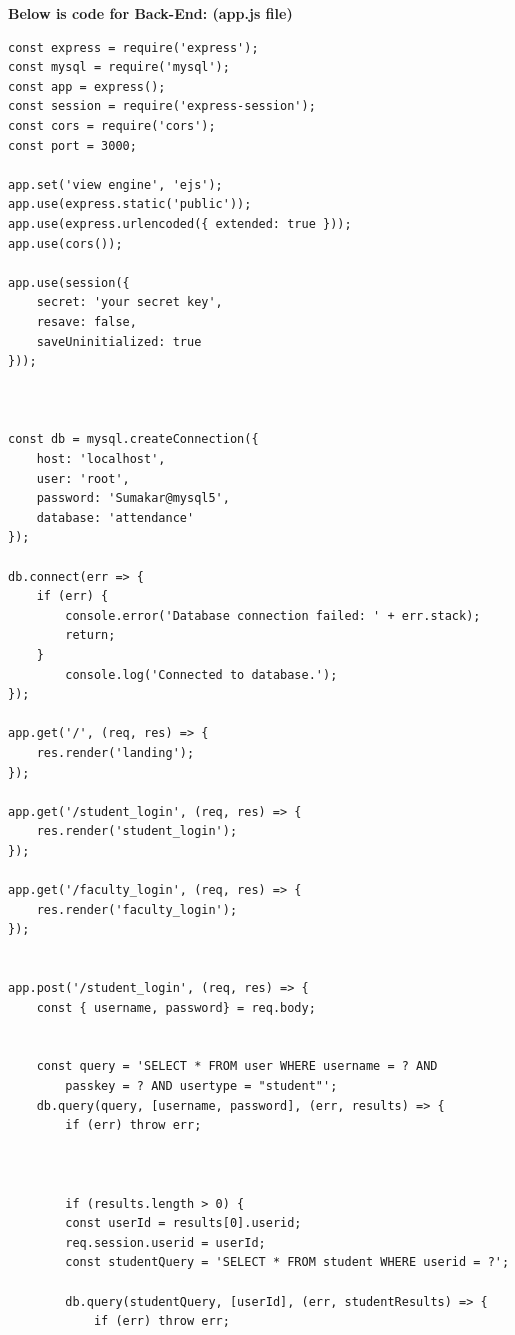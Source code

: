 \documentclass{article}
\begin{document}
\begin{large}
\vspace*{1cm}
\bfseries{Below is code for Back-End: (app.js file)}
\begin{verbatim}
const express = require('express');
const mysql = require('mysql');
const app = express();
const session = require('express-session');
const cors = require('cors');
const port = 3000;

app.set('view engine', 'ejs');
app.use(express.static('public'));
app.use(express.urlencoded({ extended: true }));
app.use(cors());

app.use(session({
    secret: 'your secret key',
    resave: false,
    saveUninitialized: true
}));



const db = mysql.createConnection({
    host: 'localhost',
    user: 'root',
    password: 'Sumakar@mysql5',
    database: 'attendance'
});

db.connect(err => {
    if (err) {
        console.error('Database connection failed: ' + err.stack);
        return;
    }
        console.log('Connected to database.');
});

app.get('/', (req, res) => {
    res.render('landing');
});

app.get('/student_login', (req, res) => {
    res.render('student_login');
});

app.get('/faculty_login', (req, res) => {
    res.render('faculty_login');
});


app.post('/student_login', (req, res) => {
    const { username, password} = req.body;
    

    const query = 'SELECT * FROM user WHERE username = ? AND 
        passkey = ? AND usertype = "student"';
    db.query(query, [username, password], (err, results) => {
        if (err) throw err;

        

        if (results.length > 0) {
        const userId = results[0].userid;
        req.session.userid = userId;
        const studentQuery = 'SELECT * FROM student WHERE userid = ?';
        
        db.query(studentQuery, [userId], (err, studentResults) => {
            if (err) throw err;


\end{verbatim}
\end{large}
\end{document}
